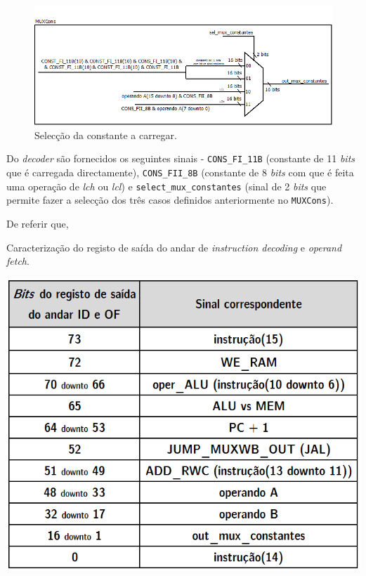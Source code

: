 \documentclass[11pt]{article}
\numberwithin{equation}{section}
\begin{document}
\vspace{-2.1mm}

\begin{figure}[H]
	\centering
	\includegraphics[keepaspectratio=true, scale=0.40]{imagens/OF2}
	\caption{Selecção da constante a carregar.}
	\vspace{-0.8em}
\end{figure}

Do \textit{decoder} são fornecidos os seguintes sinais - \texttt{CONS\_FI\_11B} (constante de 11 \textit{bits} que é carregada directamente), \texttt{CONS\_FII\_8B} (constante de 8 \textit{bits} com que é feita uma operação de \textit{lch} ou \textit{lcl}) e \texttt{select\_mux\_constantes}  (sinal de 2 \textit{bits} que permite fazer a selecção dos três casos definidos anteriormente no \texttt{MUXCons}).

De referir que, 

\begin{table}[h]
	\centering
	\caption{Caracterização do registo de saída do andar de \textit{instruction decoding} e \textit{operand fetch}.}
	\vspace{-2mm}
 	\includegraphics[keepaspectratio=true, scale=0.45]{tabelas/regIDOF}
\end{table}
\end{document}
